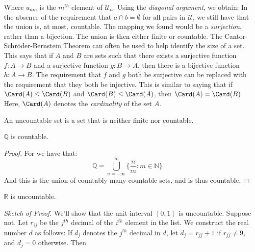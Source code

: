         Where $u_{nm}$ is the $m^{th}$ element of
        $\mathcal{U}_{n}$.
        Using the \textit{diagonal argument},
        we obtain:
        In the absence of the requirement that
        $a\cap{b}=\emptyset$ for all pairs in $\mathcal{U}$,
        we still have that the union is, at most, countable.
        The mapping we found would be a
        \textit{surjection}, rather than a bijection.
        The union is then either finite or countable. The
        Cantor-Schr\"{o}der-Bernstein Theorem can often be
        used to help identify the size of a set. This says
        that if $A$ and $B$ are sets such that there exists
        a surjective function $f:A\rightarrow{B}$ and a
        surjective function $g:B\rightarrow{A}$, then there
        is a bijective function $h:A\rightarrow{B}$. The
        requirement that $f$ and $g$ both be surjective
        can be replaced with the requirement that they both
        be injective. This is similar to saying that if
        $\Card(A)\leq\Card(B)$ and $\Card(B)\leq\Card(A)$,
        then $\Card(A)=\Card(B)$. Here, $\Card(A)$ denotes
        the \textit{cardinality} of the set $A$.
        \begin{definition}
            An uncountable set is a set that is
            neither finite nor countable.
        \end{definition}
        \begin{theorem}
            $\mathbb{Q}$ is countable.
        \end{theorem}
        \begin{proof}
            For we have that:
            \begin{equation}
                \mathbb{Q}=
                \bigcup_{n=-\infty}^{\infty}
                \Big\{\frac{n}{m}:m\in\mathbb{N}\Big\}
            \end{equation}
            And this is the union of countably
            many countable sets, and is thus countable.
        \end{proof}
        \begin{theorem}
            $\mathbb{R}$ is uncountable.
        \end{theorem}
        \textit{Sketch of Proof.} We'll show that the unit
        interval $(0,1)$ is uncountable. Suppose not.
        Let $r_{ij}$ be the $j^{th}$ decimal of the $i^{th}$
        element in the list. We construct the real number
        $d$ as follows: If $d_{j}$ denotes the $j^{th}$
        decimal in $d$, let $d_{j}=r_{jj}+1$ if
        $r_{jj}\ne{9}$, and $d_{j}=0$ otherwise. Then
